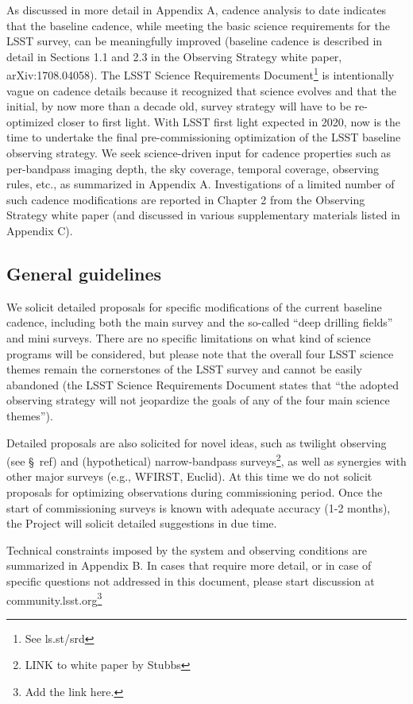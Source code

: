 \documentclass[DM,lsstdraft,toc,usenatbib]{lsstdoc}
\begin{document}
As discussed in more detail in Appendix A, cadence analysis to date indicates that the baseline 
cadence, while meeting the basic science requirements for the LSST survey, can be meaningfully 
improved (baseline cadence is described in detail in Sections 1.1 and 2.3 in the Observing Strategy
white paper, arXiv:1708.04058). The LSST Science Requirements Document\footnote{See ls.st/srd} 
is intentionally vague on cadence details because it recognized that science evolves and that the 
initial, by now more than a decade old, survey strategy will have to be re-optimized closer to first 
light. With LSST first light expected in 2020, now is the time to undertake the final pre-commissioning
optimization of the LSST baseline observing strategy. We seek science-driven input for cadence 
properties such as per-bandpass imaging depth, the sky coverage, temporal coverage, observing
rules, etc., as summarized in Appendix A. Investigations of a limited number of such cadence 
modifications are reported in Chapter 2 from the Observing Strategy white paper (and discussed 
in various supplementary materials listed in Appendix C). 



\subsection{General guidelines} 

We solicit detailed proposals for specific modifications of the current baseline cadence, including 
both the main survey and the so-called ``deep drilling fields'' and mini surveys. There are no 
specific limitations on what kind of science programs will be considered, but please note that 
the overall four LSST science themes remain the cornerstones of the LSST survey and cannot 
be easily abandoned (the LSST Science Requirements Document states that ``the adopted observing 
strategy will not jeopardize the goals of any of the four main science themes''). 

Detailed proposals are also solicited for novel ideas, such as twilight observing (see \S~ref{}) and 
(hypothetical) narrow-bandpass surveys\footnote{LINK to white paper by Stubbs}, as well as synergies 
with other major surveys (e.g., WFIRST, Euclid). At this 
time we do not solicit proposals for optimizing observations during commissioning period. Once 
the start of commissioning surveys is known with adequate accuracy (1-2 months), the Project will 
solicit detailed suggestions in due time. 

Technical constraints imposed by the system and observing conditions are summarized in 
Appendix B. In cases that require more detail, or in case of specific questions not addressed in this 
document, please start discussion at community.lsst.org\footnote{Add the link here.} 
\end{document}

